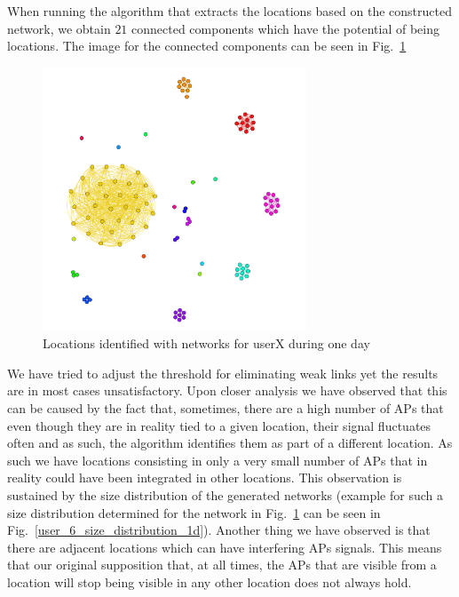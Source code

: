 When running the algorithm that extracts the locations based on the constructed
network, we obtain $21$ connected components which have the potential of being
locations. The image for the connected components can be seen in
Fig.~\ref{user_6_networks_1d} 

\begin{figure}[!h]
\centering
\includegraphics[width=0.7\textwidth]{figures/networks/user_6_day0_networks.png}
\caption{Locations identified with networks for userX during one day}
\label{user_6_networks_1d}
\end{figure}

We have tried to adjust the threshold for eliminating weak links yet the results
are in most cases unsatisfactory. Upon closer analysis we have observed that
this can be caused by the fact that, sometimes, there are a high number of APs
that even though they are in reality tied to a given location, their signal
fluctuates often and as such, the algorithm identifies them as part of a
different location. As such we have locations consisting in only a very small
number of APs that in reality could have been integrated in other locations.
This observation is sustained by the size distribution of the generated networks
(example for such a size distribution determined for the network in
Fig.~\ref{user_6_networks_1d} can be seen in
Fig.~\ref{user_6_size_distribution_1d}). Another thing we have observed is that
there are adjacent locations which can have interfering APs signals. This means
that our original supposition that, at all times, the APs that are visible from
a location will stop being visible in any other location does not always hold.

